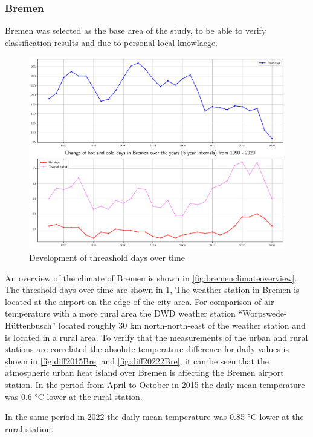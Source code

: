 \documentclass[12pt,a4paper, english]{article}
\begin{document}
  \subsubsection{Bremen}
  Bremen was selected as the base area of the study, to be able to verify classification results and due to personal local knowlaege. 
    \begin{figure}[!htbp]
     \centering
        \includegraphics[width=\textwidth]{img/BremenKIChanges}
        \caption{Development of threashold days over time\label{fig:climateovertimeBremen}}
   \end{figure}
   An overview of the climate of Bremen is shown in \cref{fig:bremenclimateoverview}.
   The threshold days over time are shown in \cref{fig:climateovertimeBremen},
   The weather station in Bremen is located at the airport on the edge of the city area. %
   For comparison of air temperature with a more rural area the \gls{DWD} weather station ``Worpswede-Hüttenbusch'' located roughly 30 km north-north-east of the weather station and is located in a rural area. 
   To verify that the measurements of the urban and rural stations are correlated the absolute temperature difference for daily values is shown in \cref{fig:diff2015Bre} and \cref{fig:diff20222Bre}, it can be seen that the atmospheric urban heat island over Bremen is affecting the Bremen airport station. 
   In the period from April to October in 2015 the daily mean temperature was 0.6 °C lower at the rural station. 

   In the same period in 2022 the daily mean temperature was 0.85 °C lower at the rural station. 
\end{document}
